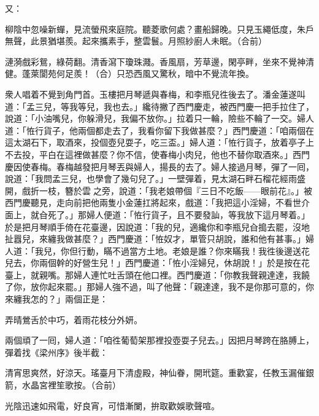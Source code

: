 又：

\begin{myquote} 
柳陰中忽噪新蟬，見流螢飛來庭院。聽菱歌何處？畫船歸晚。只見玉繩低度，朱戶無聲，此景猶堪羨。起來攜素手，整雲鬟。月照紗廚人未眠。{\markfont\small{（合前）}}

{}漣漪戲彩鴛，綠荷翻。清香瀉下瓊珠濺。香風扇，芳草邊，閑亭畔，坐來不覺神清健。蓬萊閬苑何足羨！{\markfont\small{（合）}}只恐西風又驚秋，暗中不覺流年換。
\end{myquote} 

衆人唱着不覺到角門首。玉樓把月琴遞與春梅，和李瓶兒徃後去了。{}潘金蓮遂叫道：「孟三兒，等我等兒，我也去。」纔待撇了西門慶走，被西門慶一把手拉住了，說道：「小油嘴兒，你躲滑兒，我偏不放你。」拉着只一輪，險些不輪了一交。{}婦人道：「恠行貨子，他兩個都走去了，我看你留下我做甚麼？」西門慶道：「咱兩個在這太湖石下，取酒來，投個壺兒耍子，吃三盃。」婦人道：「恠行貨子，放着亭子上不去投，平白在這裡做甚麼？你不信，使春梅小肉兒，他也不替你取酒來。」西門慶因使春梅。春梅越發把月琴丟與婦人，揚長的去了。{}婦人接過月琴，彈了一囘，說道：「我問孟三兒，也學會了幾句兒了。」一壁彈着，見太湖石畔石榴花經雨盛開，戲折一枝，簪於雲𩬆之旁，{}說道：「我老娘帶個『三日不吃飯——眼前花』。」{}被西門慶聽見，走向前把他兩隻小金蓮扛將起來，戲道：「我把這小淫婦，不看世介面上，就㒲死了。」{}那婦人便道：「恠行貨子，且不要發訕，等我放下這月琴着。」{}於是把月琴順手倚在花臺邊，因說道：「我的兒，適纔你和李瓶兒㒲搗去罷，沒地扯囂兒，來纏我做甚麼？」西門慶道：「恠奴才，單管只胡說，誰和他有甚事。」婦人道：「我兒，你但行動，瞞不過當方土地。老娘是誰？你來瞞我！我徃後邊送花兒去，你兩個幹的好營生兒！」西門慶道：「恠小淫婦兒，休胡說！」於是按在花臺上，就親嘴。那婦人連忙吐舌頭在他口裡。西門慶道：「你教我聲親達達，我饒了你，放你起來罷。」那婦人強不過，叫了他聲：「親達達，我不是你那可意的，你來纏我怎的？」{}兩個正是：

\begin{myquote} 
弄晴鶯舌於中巧，着雨花枝分外妍。
\end{myquote} 

兩個頑了一囘，婦人道：「咱徃葡萄架那裡投壺耍子兒去。」因把月琴跨在胳膊上，{}彈着找《梁州序》後半截：{}

\begin{myquote}
{}清宵思爽然，好涼天。瑤臺月下清虛殿，神仙眷，開玳筵。重歡宴，任教玉漏催銀箭，水晶宮裡笙歌按。{\markfont\small{（合前）}}

{}光陰迅速如飛電，好良宵，可惜漸闌，拚取歡娛歌聲喧。
\end{myquote}

